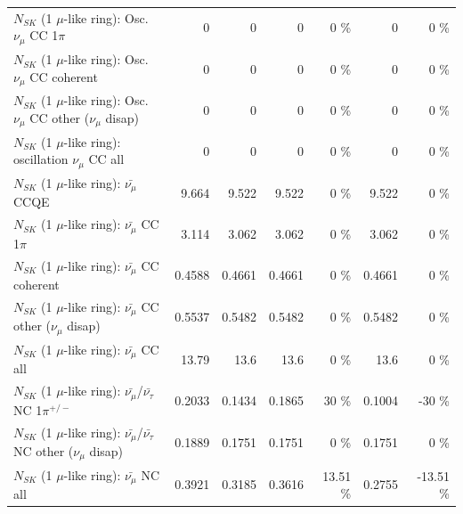 \begin{table}
\begin{tabular}{| l | r | r | r  r | r  r |}
                          $N_{SK}$ (1 $\mu$-like ring): Osc. $\nu_\mu$ CC 1$\pi$ &               0 &               0 &               0 &        0 \%  &               0 &        0 \%  \\ 
                        $N_{SK}$ (1 $\mu$-like ring): Osc. $\nu_\mu$ CC coherent &               0 &               0 &               0 &        0 \%  &               0 &        0 \%  \\ 
         $N_{SK}$ (1 $\mu$-like ring): Osc. $\nu_\mu$ CC other ($\nu_\mu$ disap) &               0 &               0 &               0 &        0 \%  &               0 &        0 \%  \\ 
                      $N_{SK}$ (1 $\mu$-like ring): oscillation $\nu_\mu$ CC all &               0 &               0 &               0 &        0 \%  &               0 &        0 \%  \\ 
\hline
\hline
                              $N_{SK}$ (1 $\mu$-like ring): $\bar{\nu_\mu}$ CCQE &           9.664 &           9.522 &           9.522 &        0 \%  &           9.522 &        0 \%  \\ 
                         $N_{SK}$ (1 $\mu$-like ring): $\bar{\nu_\mu}$ CC 1$\pi$ &           3.114 &           3.062 &           3.062 &        0 \%  &           3.062 &        0 \%  \\ 
                       $N_{SK}$ (1 $\mu$-like ring): $\bar{\nu_\mu}$ CC coherent &          0.4588 &          0.4661 &          0.4661 &        0 \%  &          0.4661 &        0 \%  \\ 
        $N_{SK}$ (1 $\mu$-like ring): $\bar{\nu_\mu}$ CC other ($\nu_\mu$ disap) &          0.5537 &          0.5482 &          0.5482 &        0 \%  &          0.5482 &        0 \%  \\ 
                          $N_{SK}$ (1 $\mu$-like ring): $\bar{\nu_{\mu}}$ CC all &           13.79 &            13.6 &            13.6 &        0 \%  &            13.6 &        0 \%  \\ 
\hline
  $N_{SK}$ (1 $\mu$-like ring): $\bar{\nu_\mu}$/$\bar{\nu_\tau}$ NC 1$\pi^{+/-}$ &          0.2033 &          0.1434 &          0.1865 &       30 \%  &          0.1004 &      -30 \%  \\ 
$N_{SK}$ (1 $\mu$-like ring): $\bar{\nu_\mu}$/$\bar{\nu_\tau}$ NC other ($\nu_\mu$ disap) &          0.1889 &          0.1751 &          0.1751 &        0 \%  &          0.1751 &        0 \%  \\ 
                          $N_{SK}$ (1 $\mu$-like ring): $\bar{\nu_{\mu}}$ NC all &          0.3921 &          0.3185 &          0.3616 &    13.51 \%  &          0.2755 &   -13.51 \%  \\ 

\end{tabular}
\end{table}
